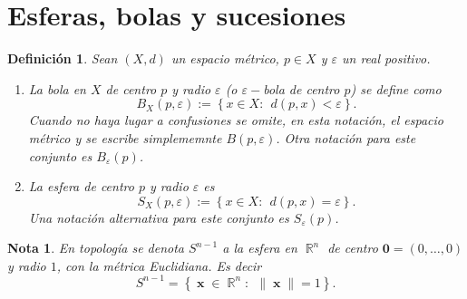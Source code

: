 \documentclass[x11names, 12pt]{book}
\newtheorem{definicion}{Definición}
\newtheorem{remark}{Nota}
\DeclareMathOperator{\x}{\textbf{x}}
\DeclareMathOperator{\R}{\mathbb{R}}
\begin{document}
\section{Esferas, bolas y sucesiones}
\begin{definicion}
    Sean $(X,d)$ un espacio métrico, $p\in X$ y $\varepsilon$ un real positivo.
    \begin{enumerate}
        \item La bola en $X$ de centro $p$ y radio $\varepsilon$ (o $\varepsilon-$bola de centro $p$) se define como
    $$B_X(p,\varepsilon):=\left\{x\in X:\ \ d(p,x)<\varepsilon \right\}.$$
    Cuando no haya lugar a confusiones se omite, en esta notación, el espacio métrico y se escribe simplememnte $B(p, \varepsilon)$. Otra notación para este conjunto es $B_\varepsilon (p)$.
    \item La esfera de centro $p$ y radio $\varepsilon$ es
    $$S_X(p,\varepsilon):=\left\{x\in X:\ \ d(p,x)=\varepsilon \right\}.$$
    Una notación alternativa para este conjunto es $S_\varepsilon (p)$.
    \end{enumerate}
    \end{definicion}
    \begin{remark}
    En topología se denota $S^{n-1}$ a la esfera en $\R^{n}$ de centro $\textbf{0}=(0,\dots, 0)$ y radio $1$, con la métrica Euclidiana. Es decir
    $$S^{n-1}=\left\{\x\in \R^n:\ \ \|\x\|=1 \right\}.$$
    \end{remark}
   
\end{document}
